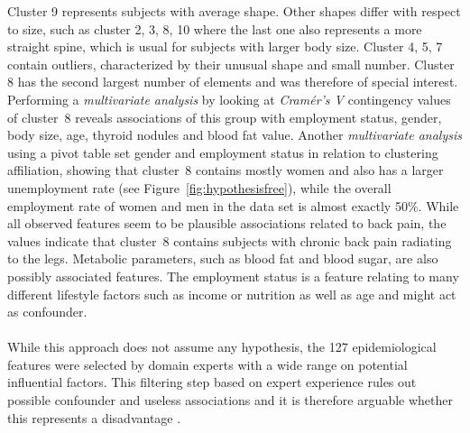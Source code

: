 \documentclass[journal]{style/vgtc} 			          %
\begin{document}
Cluster 9 represents subjects with average shape.
%
Other shapes differ with respect to size, such as cluster 2, 3, 8, 10 where the last one also represents a more straight spine, which is usual for subjects with larger body size.
%
Cluster 4, 5, 7 contain outliers, characterized by their unusual shape and small number.
%
Cluster 8 has the second largest number of elements and was therefore of special interest.
%
Performing a \emph{multivariate analysis} by looking at \emph{Cram\'{e}r's V} contingency values of cluster~8 reveals associations of this group with employment status, gender, body size, age, thyroid nodules and blood fat value.
%
Another \emph{multivariate analysis} using a pivot table set gender and employment status in relation to clustering affiliation, showing that cluster~8 contains mostly women and also has a larger unemployment rate (see Figure~\ref{fig:hypothesisfree}), while the overall employment rate of women and men in the data set is almost exactly 50\%.
%
While all observed features seem to be plausible associations related to back pain, the values indicate that cluster~8 contains subjects with chronic back pain radiating to the legs.
%
Metabolic parameters, such as blood fat and blood sugar, are also possibly associated features.
The employment status is a feature relating to many different lifestyle factors such as income or nutrition as well as age and might act as confounder.
\\\\
While this approach does not assume any hypothesis, the 127 epidemiological features were selected by domain experts with a wide range on potential influential factors.
%
This filtering step based on expert experience rules out possible confounder and useless associations and it is therefore arguable whether this represents a disadvantage \cite{Wiley2008}.
%
\end{document}
